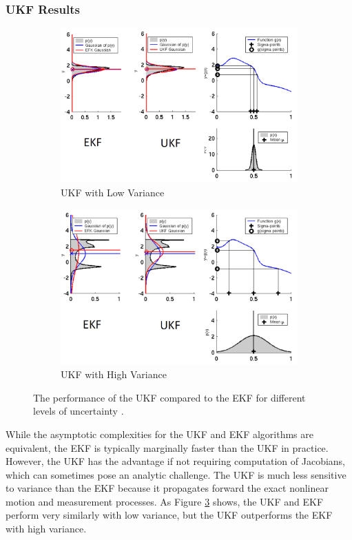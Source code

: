 \documentclass[twoside]{article}
\begin{document}
\subsubsection{UKF Results}
\begin{figure}[t]
\centering
\begin{subfigure}{.5\textwidth}
  \centering
  \includegraphics[width=.9\linewidth]{UKF_low_var.png}
  \caption{UKF with Low Variance}
  \label{fig:UKF_low}
\end{subfigure}%
\begin{subfigure}{.5\textwidth}
  \centering
  \includegraphics[width=.9\linewidth]{UKF_high_var.png}
  \caption{UKF with High Variance}
  \label{fig:UKF_high}
\end{subfigure}
\caption{The performance of the UKF compared to the EKF for different levels of uncertainty \cite{Xmisc}.}
\label{fig:UKF_variance}
\end{figure}
While the asymptotic complexities for the UKF and EKF algorithms are equivalent, the EKF is typically marginally faster than the UKF in practice. However, the UKF has the advantage if not requiring computation of Jacobians, which can sometimes pose an analytic challenge.
The UKF is much less sensitive to variance than the EKF because it propagates forward the exact nonlinear motion and measurement processes. As Figure \ref{fig:UKF_variance} shows, the UKF and EKF perform very similarly with low variance, but the UKF outperforms the EKF with high variance.
\end{document}
